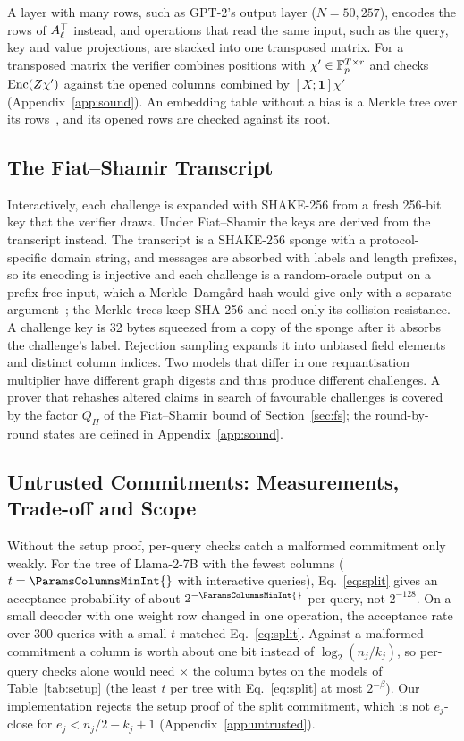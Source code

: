  A layer with many rows, such as GPT-2's output layer
($N=50{,}257$), encodes the rows of $A_\ell^\top$ instead, and operations that read the same input,
such as the query, key and value projections, are stacked into one transposed matrix. For a
transposed matrix the verifier combines positions with $\chi'\in\mathbb{F}_p^{T\times r}$ and checks
$\mathrm{Enc}(Z\chi')$ against the opened columns combined by $[X;\mathbf 1]\chi'$
(Appendix~\ref{app:sound}). An embedding table without a bias is a Merkle tree over its
rows~\cite{commitllm2026}, and its opened rows are checked against its root.

\subsection{The Fiat--Shamir Transcript}

Interactively, each challenge is expanded with SHAKE-256 from a fresh 256-bit key that the
verifier draws. Under Fiat--Shamir the keys are derived from the transcript instead. The
transcript is a SHAKE-256 sponge with a protocol-specific domain string, and messages are absorbed
with labels and length prefixes, so its encoding is injective and each challenge is a random-oracle
output on a prefix-free input, which a Merkle--Damg\aa{}rd hash would give only with a separate
argument~\cite{coron2005md}; the Merkle trees keep SHA-256 and need only its collision resistance.
A challenge key is 32 bytes
squeezed from a copy of the sponge after it absorbs the challenge's label. Rejection sampling
expands it into unbiased field elements and distinct column indices. Two models that differ in one
requantisation multiplier have different graph digests and thus produce different challenges. A
prover that rehashes altered claims in search of favourable challenges is covered by the factor
$Q_H$ of the Fiat--Shamir bound of Section~\ref{sec:fs}; the round-by-round states are defined in
Appendix~\ref{app:sound}.

\subsection{Untrusted Commitments: Measurements, Trade-off and Scope}

 Without the setup proof, per-query checks catch a
malformed commitment only weakly. For the tree of Llama-2-7B with the fewest columns
($t=\ParamsColumnsMinInt{}$ with interactive queries), Eq.~\eqref{eq:split} gives an acceptance probability of
about $2^{-\ParamsColumnsMinInt{}}$ per query, not $2^{-128}$. On a small decoder with one weight row changed in one
operation, the acceptance rate over 300 queries with a small $t$ matched Eq.~\eqref{eq:split}.
Against a malformed commitment a column is worth about one bit instead of $\log_2(n_j/k_j)$, so
per-query checks alone would need \SplitColumnFactorRange{}$\times$ the column bytes on the models of
Table~\ref{tab:setup} (the least $t$ per tree with Eq.~\eqref{eq:split} at most $2^{-\beta}$). Our implementation
rejects the setup proof of the split commitment, which is not $e_j$-close for
$e_j<n_j/2-k_j+1$ (Appendix~\ref{app:untrusted}).

